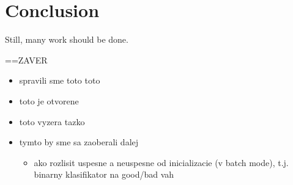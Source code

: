 \section*{Conclusion}
\label{sec:conclusion} 

Still, many work should be done. 


==ZAVER 
\begin{itemize} 
\item   spravili sme toto toto
\item   toto je otvorene
\item   toto vyzera tazko
\item   tymto by sme sa zaoberali dalej 
\begin{itemize}
\item ako rozlisit uspesne a neuspesne od inicializacie (v batch mode), t.j. binarny klasifikator na good/bad vah 
\end{itemize} 

\end{itemize} 



